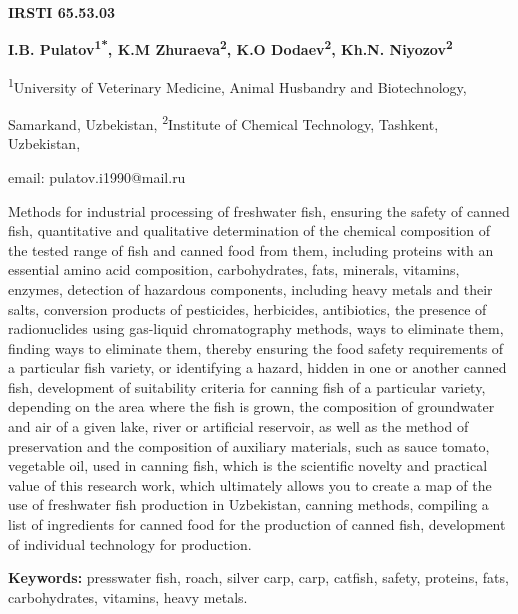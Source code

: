 \clearpage
{\bfseries IRSTI 65.53.03}


\begin{center}
{\bfseries I.B. Pulatov\textsuperscript{1*}, K.M
Zhuraeva\textsuperscript{2}, K.O Dodaev\textsuperscript{2}, Kh.N.
Niyozov\textsuperscript{2}}

\textsuperscript{1}University of Veterinary Medicine, Animal Husbandry
and Biotechnology,

Samarkand, Uzbekistan, \textsuperscript{2}Institute of Chemical
Technology, Tashkent, Uzbekistan,

email: pulatov.i1990@mail.ru
\end{center}

\hspace{1.5em} Methods for industrial processing of freshwater fish, ensuring the
safety of canned fish, quantitative and qualitative determination of the
chemical composition of the tested range of fish and canned food from
them, including proteins with an essential amino acid composition,
carbohydrates, fats, minerals, vitamins, enzymes, detection of hazardous
components, including heavy metals and their salts, conversion products
of pesticides, herbicides, antibiotics, the presence of radionuclides
using gas-liquid chromatography methods, ways to eliminate them, finding
ways to eliminate them, thereby ensuring the food safety requirements of
a particular fish variety, or identifying a hazard, hidden in one or
another canned fish, development of suitability criteria for canning
fish of a particular variety, depending on the area where the fish is
grown, the composition of groundwater and air of a given lake, river or
artificial reservoir, as well as the method of preservation and the
composition of auxiliary materials, such as sauce tomato, vegetable oil,
used in canning fish, which is the scientific novelty and practical
value of this research work, which ultimately allows you to create a map
of the use of freshwater fish production in Uzbekistan, canning methods,
compiling a list of ingredients for canned food for the production of
canned fish, development of individual technology for production.

{\hspace{1.5em} \bfseries Keywords:} presswater fish, roach, silver carp, carp, catfish,
safety, proteins, fats, carbohydrates, vitamins, heavy metals.

